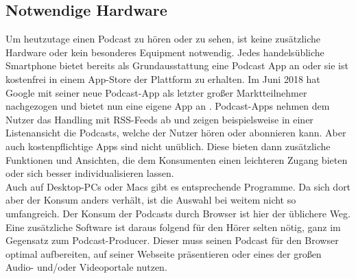 \documentclass[11pt,a4paper]{scrreprt}
\begin{document}
\subsection{Notwendige Hardware}
Um heutzutage einen Podcast zu hören oder zu sehen, ist keine zusätzliche Hardware oder kein besonderes Equipment notwendig. Jedes handelsübliche Smartphone bietet bereits als Grundausstattung eine Podcast \ac{App} an oder sie ist kostenfrei in einem \ac{App}-Store der Plattform zu erhalten. Im Juni 2018 hat Google mit seiner neue Podcast-\ac{App} als letzter großer Marktteilnehmer nachgezogen und bietet nun eine eigene \ac{App} an \cite{Newton2018}. Podcast-\ac{App}s nehmen dem Nutzer das Handling mit \ac{RSS}-Feeds ab und zeigen beispielsweise in einer Listenansicht die Podcasts, welche der Nutzer hören oder abonnieren kann. Aber auch kostenpflichtige \ac{App}s sind nicht unüblich. Diese bieten dann zusätzliche Funktionen und Ansichten, die dem Konsumenten einen leichteren Zugang bieten oder sich besser individualisieren lassen.\\
Auch auf Desktop-PCs oder Macs gibt es entsprechende Programme. Da sich dort aber der Konsum anders verhält, ist die Auswahl bei weitem nicht so umfangreich. Der Konsum der Podcasts durch Browser ist hier der üblichere Weg. Eine zusätzliche Software ist daraus folgend für den Hörer selten nötig, ganz im Gegensatz zum Podcast-Producer. Dieser muss seinen Podcast für den Browser optimal aufbereiten, auf seiner Webseite präsentieren oder eines der großen Audio- und/oder Videoportale nutzen. 
\end{document}
